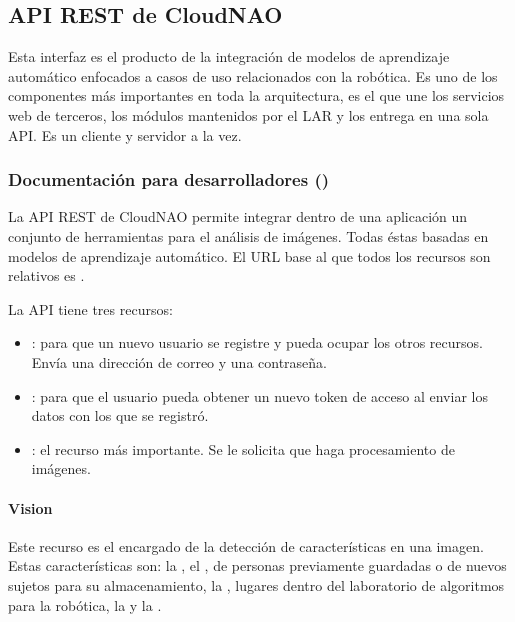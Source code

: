 

\subsection{API REST de CloudNAO}
\label{\detokenize{chapter_two/desc_cloudnao:api-rest-de-cloudnao}}
Esta interfaz es el producto de la integración de modelos de aprendizaje
automático
enfocados a casos de uso relacionados con la robótica.
Es uno de los componentes más importantes en toda la arquitectura,
es el que une los servicios web de
terceros, los módulos mantenidos por el LAR y los entrega en una sola API.
Es un cliente y servidor a la vez.


\subsubsection{Documentación para desarrolladores ()}
\label{\detokenize{chapter_two/desc_cloudnao:documentacion-para-desarrolladores-clientes}}
La API REST de CloudNAO permite integrar dentro de una aplicación un
conjunto de herramientas para el análisis de imágenes.
Todas éstas basadas en modelos de aprendizaje automático. El URL base al
que todos los recursos son relativos es .

La API tiene tres recursos:
\begin{itemize}
\item {} 
: para que un nuevo usuario se registre y pueda ocupar los otros recursos. Envía una dirección de correo y una contraseña.

\item {} 
: para que el usuario pueda obtener un nuevo token de acceso al enviar los datos con los que se registró.

\item {} 
: el recurso más importante. Se le solicita que haga procesamiento de imágenes.

\end{itemize}

\paragraph{Vision}
\label{\detokenize{chapter_two/desc_cloudnao:vision}}
Este recurso es el encargado de la detección de características en una
imagen. Estas características son: la , el
, de personas previamente guardadas o de
nuevos sujetos para su almacenamiento, la , lugares
dentro del laboratorio de algoritmos para la robótica, la
y la .


